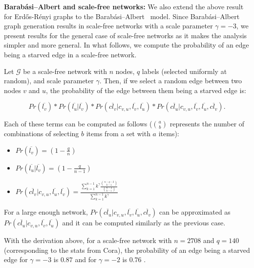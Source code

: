 \documentclass{article}
\newcommand{\graph}[1]{\ensuremath{\mathcal{#1}}}
\begin{document}
\textbf{Barabási–Albert and scale-free networks:} We also extend the above result for Erd\H{o}s-R\'enyi graphs to the Barabási–Albert~\cite{barabasi1999emergence} model. Since Barabási–Albert graph generation results in scale-free networks with a scale parameter $\gamma=-3$, we present results for the general case of scale-free networks as it makes the analysis simpler and more general. In what follows, we compute the probability of an edge being a starved edge in a scale-free network.

Let $\graph{G}$ be a scale-free network with $n$ nodes, $q$ labels (selected uniformly at random), and scale parameter $\gamma$. Then, if we select a random edge between two nodes $v$ and $u$, the probability of the edge between them being a starved edge is:

\begin{equation*}
Pr(\overline{l_v}) * Pr(\overline{l_u} | \overline{l_v}) * Pr(\overline{cl_v} | c_{v,u},\overline{l_v},\overline{l_u}) * Pr(\overline{cl_u} | c_{v,u},\overline{l_v},\overline{l_u},\overline{cl_v}).
\end{equation*}


Each of these terms can be computed as follows ($a \choose b$ represents the number of combinations of selecting $b$ items from a set with $a$ items):

\begin{itemize}
    \item $Pr(\overline{l_v}) = (1 - \frac{q}{n})$
    \item $Pr(\overline{l_u} | \overline{l_v}) = (1 - \frac{q}{n-1})$
    \item $Pr(\overline{cl_v} | c_{v,u},\overline{l_u},\overline{l_v}) = \frac{\sum^{n-1}_{k=1} k^{\gamma} \frac{\binom{n - q - 2}{k-1}}{\binom{n-2}{k-1}}}{\sum^{n-1}_{k=1}k^{\gamma}}$
\end{itemize}

For a large enough network, $Pr(\overline{cl_u} | c_{v,u},\overline{l_v},\overline{l_u},\overline{cl_v})$
can be approximated as  $Pr(\overline{cl_u} | c_{v,u},\overline{l_v},\overline{l_u})$ and it can be computed similarly as the previous case.

With the derivation above, for a scale-free network with $n=2708$ and $q=140$ (corresponding to the stats from Cora), the probability of an edge being a starved edge for $\gamma=-3$ is $0.87$ and for $\gamma=-2$ is $0.76$ .
\end{document}
